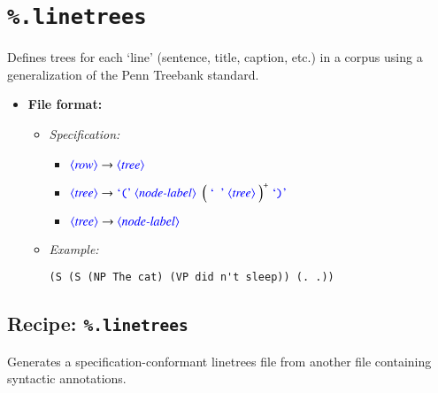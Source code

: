 \documentclass[12pt]{report}
\def\blue{\color{blue}}
\def\magenta{\color{magenta}}
\begin{document}
\section{\blue\tt \%.linetrees}

Defines trees for each `line' (sentence, title, caption, etc.) in a corpus using a generalization of the Penn Treebank standard.

\begin{itemize}
\item\textbf{File format:}
\begin{itemize}
\item\textit{Specification:}
\begin{itemize}
\item $\dtype{row} \rightarrow \dtype{tree}$
\item $\dtype{tree}  \rightarrow \dcode{(} \ \dtype{node-label} \ \ \smash{\Big( \ \dcode{\ } \ \dtype{tree} \ \Big)^+} \ \dcode{)}$
\item $\dtype{tree}  \rightarrow \dtype{node-label}$
\end{itemize}

\item\textit{Example:}
{\magenta\begin{verbatim}
(S (S (NP The cat) (VP did n't sleep)) (. .))
\end{verbatim}
}
\end{itemize}
\end{itemize}

\subsection{Recipe: {\blue\tt \%.linetrees}}


Generates a specification-conformant linetrees file from another file containing syntactic annotations.
\end{document}
